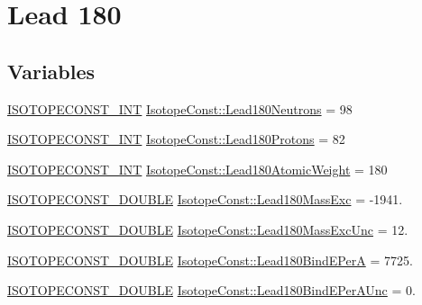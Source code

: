 \hypertarget{group___isotope_const-_lead-_pb180}{}\section{Lead 180}
\label{group___isotope_const-_lead-_pb180}
\subsection*{Variables}
\begin{DoxyCompactItemize}
\item 
\mbox{\hyperlink{group___isotope_const-_macros_ga5f18360b3e99483a35c32d789e62621c}{I\+S\+O\+T\+O\+P\+E\+C\+O\+N\+S\+T\+\_\+\+I\+NT}} \mbox{\hyperlink{group___isotope_const-_lead-_pb180_ga879000a27f7e99cd638d9df05b23bca2}{Isotope\+Const\+::\+Lead180\+Neutrons}} = 98
\item 
\mbox{\hyperlink{group___isotope_const-_macros_ga5f18360b3e99483a35c32d789e62621c}{I\+S\+O\+T\+O\+P\+E\+C\+O\+N\+S\+T\+\_\+\+I\+NT}} \mbox{\hyperlink{group___isotope_const-_lead-_pb180_ga1fd3a5ed716df82dbe8d28757e44b409}{Isotope\+Const\+::\+Lead180\+Protons}} = 82
\item 
\mbox{\hyperlink{group___isotope_const-_macros_ga5f18360b3e99483a35c32d789e62621c}{I\+S\+O\+T\+O\+P\+E\+C\+O\+N\+S\+T\+\_\+\+I\+NT}} \mbox{\hyperlink{group___isotope_const-_lead-_pb180_ga22228ce7daa0cf1ee1cd05462d80c2b7}{Isotope\+Const\+::\+Lead180\+Atomic\+Weight}} = 180
\item 
\mbox{\hyperlink{group___isotope_const-_macros_ga8f45a7272ce02c0b4c65c44636ed719a}{I\+S\+O\+T\+O\+P\+E\+C\+O\+N\+S\+T\+\_\+\+D\+O\+U\+B\+LE}} \mbox{\hyperlink{group___isotope_const-_lead-_pb180_ga210900f74aba58d481c8dc585efb9759}{Isotope\+Const\+::\+Lead180\+Mass\+Exc}} = -\/1941.
\item 
\mbox{\hyperlink{group___isotope_const-_macros_ga8f45a7272ce02c0b4c65c44636ed719a}{I\+S\+O\+T\+O\+P\+E\+C\+O\+N\+S\+T\+\_\+\+D\+O\+U\+B\+LE}} \mbox{\hyperlink{group___isotope_const-_lead-_pb180_ga671b73618cf430c409bf19f6cf420c9e}{Isotope\+Const\+::\+Lead180\+Mass\+Exc\+Unc}} = 12.
\item 
\mbox{\hyperlink{group___isotope_const-_macros_ga8f45a7272ce02c0b4c65c44636ed719a}{I\+S\+O\+T\+O\+P\+E\+C\+O\+N\+S\+T\+\_\+\+D\+O\+U\+B\+LE}} \mbox{\hyperlink{group___isotope_const-_lead-_pb180_ga752a5da9ce2f27a427ef0a8c30519dbe}{Isotope\+Const\+::\+Lead180\+Bind\+E\+PerA}} = 7725.
\item 
\mbox{\hyperlink{group___isotope_const-_macros_ga8f45a7272ce02c0b4c65c44636ed719a}{I\+S\+O\+T\+O\+P\+E\+C\+O\+N\+S\+T\+\_\+\+D\+O\+U\+B\+LE}} \mbox{\hyperlink{group___isotope_const-_lead-_pb180_ga40ac959f9ece70b4a437ffc30289c256}{Isotope\+Const\+::\+Lead180\+Bind\+E\+Per\+A\+Unc}} = 0.

\end{DoxyCompactItemize}
